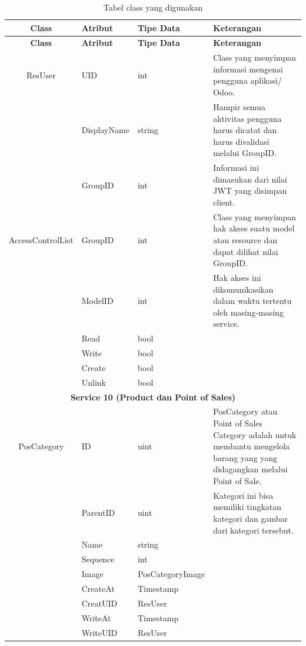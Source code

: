 \begin{longtable}{|c|p{3cm}|p{3cm}|p{4cm}|}
	\caption{Tabel class yang digunakan}
	\label{tab:daftar-class}\\
	\hline
	\textbf{Class} & \textbf{Atribut} & \textbf{Tipe Data} & \textbf{Keterangan} \\
	\hline
	\endfirsthead
	\hline
	\textbf{Class} & \textbf{Atribut} & \textbf{Tipe Data} & \textbf{Keterangan} \\
	\hline
	\endhead
	\hline
	\endfoot
	\hline
	\endlastfoot
	ResUser & UID & int & Class yang menyimpan informasi mengenai pengguna aplikasi/ Odoo. \\
	\cline{2-3}
	& DisplayName & string & Hampir semua aktivitas pengguna harus dicatat dan harus divalidasi melalui GroupID. \\
	\cline{2-3}
	& GroupID & int & Informasi ini dimasukan dari nilai JWT yang disimpan client. \\
	\hline
	AccessControlList & GroupID & int & Class yang menyimpan hak akses suatu model atau resource dan dapat dilihat nilai GroupID.  \\
	\cline{2-3}
	& ModelID & int & Hak akses ini dikomunikasikan dalam waktu tertentu oleh masing-masing service. \\
	\cline{2-3}
	& Read & bool & \\
	\cline{2-3}
	& Write & bool & \\
	\cline{2-3}
	& Create & bool & \\
	\cline{2-3}
	& Unlink & bool & \\
	\hline

	\multicolumn{4}{|c|}{\textbf{Service 10 (Product dan Point of Sales)}} \\
	\hline
	PosCategory & ID & uint & PosCategory atau Point of Sales Category adalah untuk membantu mengelola barang yang yang didagangkan melalui Point of Sale. \\
	\cline{2-3}
	& ParentID & uint & Kategori ini bisa memiliki tingkatan kategori dan gambar dari kategori tersebut. \\
	\cline{2-3}
	& Name & string & \\
	\cline{2-3}
	& Sequence & int & \\
	\cline{2-3}
	& Image &  PosCategoryImage & \\
	\cline{2-3}
	& CreateAt & Timestamp & \\
	\cline{2-3}
	& CreatUID & ResUser & \\
	\cline{2-3}
	& WriteAt & Timestamp & \\
	\cline{2-3}
	& WriteUID & ResUser & \\


\end{longtable}
